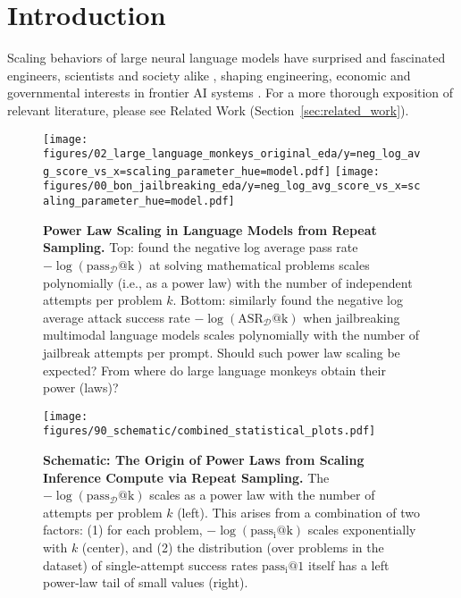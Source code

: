 \section{Introduction}
\label{sec:introduction}

Scaling behaviors of large neural language models have surprised and fascinated engineers, scientists and society alike \citep{hestness2017deep,kaplan2020scalinglawsneurallanguage,brown2020language,hoffmann2022trainingcomputeoptimallargelanguage,ganguli2022predictability,sorscher2022beyond,wei2022emergent,schaeffer2024mirage,openai2024gpt4technicalreport}, shaping engineering, economic and governmental interests in frontier AI systems \citep{bommasani2021opportunities,eloundou2023gptsgptsearlylook,anderljung2023frontierairegulationmanaging,wang2023scientificdiscovery,reuel2024openproblemstechnicalai,besiroglu2024economic,maslej2024artificialintelligenceindexreport}. For a more thorough exposition of relevant literature, please see Related Work (Section~\ref{sec:related_work}). 

\begin{figure}[t!]
    \centering
    \texttt{[image: figures/02\_large\_language\_monkeys\_original\_eda/y=neg\_log\_avg\_score\_vs\_x=scaling\_parameter\_hue=model.pdf]}
    \texttt{[image: figures/00\_bon\_jailbreaking\_eda/y=neg\_log\_avg\_score\_vs\_x=scaling\_parameter\_hue=model.pdf]}    
    \caption{\textbf{Power Law Scaling in Language Models from Repeat Sampling.} Top: \citet{brown2024largelanguagemonkeysscaling} found the negative log average pass rate $-\log(\operatorname{pass_{\mathcal{D}}@k})$ at solving mathematical problems scales polynomially (i.e., as a power law) with the number of independent attempts per problem $k$. Bottom: \citet{hughes2024bestofnjailbreaking} similarly found the negative log average attack success rate $-\log(\operatorname{ASR_{\mathcal{D}}@k})$ when jailbreaking multimodal language models scales polynomially with the number of jailbreak attempts per prompt. Should such power law scaling be expected?
    From where do large language monkeys obtain their power (laws)?
    }
    \label{fig:power_laws_repeat_sampling}
\end{figure}


\begin{figure*}[t!]
    \centering
    \texttt{[image: figures/90\_schematic/combined\_statistical\_plots.pdf]}
    \caption{\textbf{Schematic: The Origin of Power Laws from Scaling Inference Compute via Repeat Sampling.} The $- \log (\operatorname{pass_{\mathcal{D}}@k})$ scales as a power law with the number of attempts per problem $k$ (left). This arises from a combination of two factors: (1) for each problem, $-\log(\operatorname{pass_i@k})$ scales exponentially with $k$ (center), and (2) the distribution (over problems in the dataset) of single-attempt success rates $\operatorname{pass_i@1}$ itself has a left power-law tail of small values (right).}
    \label{fig:schematic}
\end{figure*}


